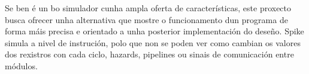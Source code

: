 Se ben é un bo simulador cunha ampla oferta de características, este proxecto busca ofrecer unha alternativa que mostre o funcionamento dun programa de forma máis precisa e orientado a unha posterior implementación do deseño. Spike simula a nivel de instrución, polo que non se poden ver como cambian os valores dos rexistros con cada ciclo, hazards, pipelines ou sinais de comunicación entre módulos.

